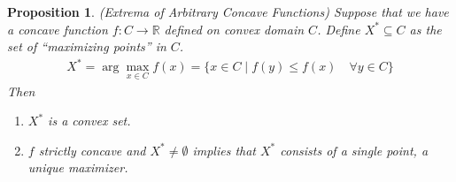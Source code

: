 \documentclass[12pt]{article}
\numberwithin{equation}{section} %
\theoremstyle{plain}
\newtheorem{prop}[thm]{Proposition}
\theoremstyle{definition}
\theoremstyle{remark}
\newcommand{\R}{\mathbb{R}}
\begin{document}
\begin{prop}{\emph{(Extrema of Arbitrary Concave Functions)}}
Suppose that we have a concave function $f:C\rightarrow \R$ defined on
convex domain $C$. Define $X^*\subseteq C$ as the set of ``maximizing
points'' in $C$.
\begin{align*}
  X^* = \arg\max_{x\in C} f(x)
  = \{ x \in C \; | \; f(y) \leq f(x) \quad \forall y \in C\}
\end{align*}
Then
\begin{enumerate}
  \item $X^*$ is a convex set.
  \item $f$ strictly concave and $X^*\neq \emptyset$ implies that $X^*$
    consists of a single point, a \emph{unique} maximizer.
\end{enumerate}
\end{prop}
\end{document}
